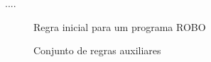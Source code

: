 ....

\begin{figure}[h]
\centering
\caption{Regra inicial para um programa ROBO}

\label{fig:rules}
\end{figure}

\begin{figure}[h]
\centering
\caption{Conjunto de regras auxiliares}

\label{fig:rules2}
\end{figure}
